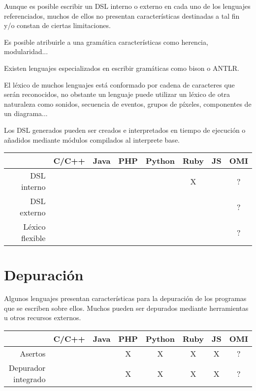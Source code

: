Aunque es posible escribir un DSL interno o externo en cada uno de los lenguajes referenciados,
muchos de ellos no presentan características destinadas a tal fin y/o constan de ciertas limitaciones.

Es posible atribuirle a una gramática características como herencia, modularidad...

Existen lenguajes especializados en escribir gramáticas como bison o ANTLR.

El léxico de muchos lenguajes está conformado por cadena de caracteres que serán reconocidos,
no obstante un lenguaje puede utilizar un léxico de otra naturaleza como sonidos,
secuencia de eventos, grupos de píxeles, componentes de un diagrama...

Los DSL generados pueden ser creados e interpretados en tiempo de ejecución o añadidos
mediante módulos compilados al interprete base.

\FloatBarrier
\begin{table}[h]
\begin{center}
 
\begin{tabular}{|r|c|c|c|c|c|c|c|} \hline
 & C/C++ & Java & PHP  & Python & Ruby & JS & OMI\\ \hline
DSL interno & & &  &  &  X &   & ? \\ \hline
DSL externo & & &  &  &  &  & ? \\ \hline
Léxico flexible & & &  &  &  &  & ? \\ \hline
\end{tabular}
\end{center}
\end{table}
\FloatBarrier

\section{Depuración}
Algunos lenguajes presentan características para la depuración de los programas que se escriben 
sobre ellos. Muchos pueden ser depurados mediante herramientas u otros recursos 
externos. 

\FloatBarrier
\begin{table}[h]
\begin{center}
 
\begin{tabular}{|r|c|c|c|c|c|c|c|} \hline
 & C/C++ & Java & PHP  & Python & Ruby & JS & OMI\\ \hline
Asertos   & & & X & X &  X & X  & ? \\ \hline
Depurador integrado & & & X & X & X & X & ? \\ \hline
\end{tabular}
\end{center}
\end{table}
\FloatBarrier


